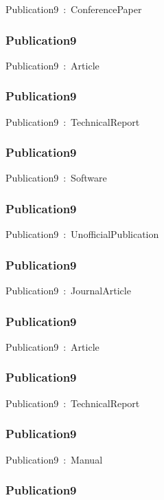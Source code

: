 \documentclass{article}
\begin{document}
Publication9~:~ConferencePaper

\subsubsection*{Publication9}

Publication9~:~Article

\subsubsection*{Publication9}

Publication9~:~TechnicalReport

\subsubsection*{Publication9}

Publication9~:~Software

\subsubsection*{Publication9}

Publication9~:~UnofficialPublication

\subsubsection*{Publication9}

Publication9~:~JournalArticle

\subsubsection*{Publication9}

Publication9~:~Article

\subsubsection*{Publication9}

Publication9~:~TechnicalReport

\subsubsection*{Publication9}

Publication9~:~Manual

\subsubsection*{Publication9}
\end{document}
